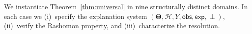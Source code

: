 \documentclass{article}
\newcommand{\Params}{\mathbf{\Theta}}         %
\newcommand{\sH}{\mathcal{H}}
\newcommand{\incomp}{\perp}                  %
\begin{document}
We instantiate Theorem~\ref{thm:universal} in nine structurally distinct
domains.  In each case we (i)~specify the explanation system
$(\Params, \sH, Y, \mathsf{obs}, \mathsf{exp}, \incomp)$, (ii)~verify the
Rashomon property, and (iii)~characterize the resolution.


















\end{document}
